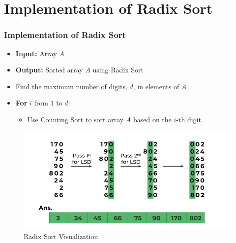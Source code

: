 \documentclass{beamer}
\begin{document}
\section{Implementation of Radix Sort}
\begin{frame}[t]
    \frametitle{Implementation of Radix Sort\cite{anderson1998implementing}}

    \begin{itemize}
        \item \textbf{Input:} Array $A$
        \item \textbf{Output:} Sorted array $A$ using Radix Sort
        \item Find the maximum number of digits, $d$, in elements of $A$
        \item \textbf{For} $i$ from $1$ to $d$:
              \begin{itemize}
                  \item Use Counting Sort to sort array $A$ based on the $i$-th digit
              \end{itemize}
    \end{itemize}

    \begin{figure}
        \includegraphics[width=0.7\linewidth]{radix_sort.png}
        \caption{Radix Sort Visualization}
    \end{figure}
\end{frame}

\end{document}
